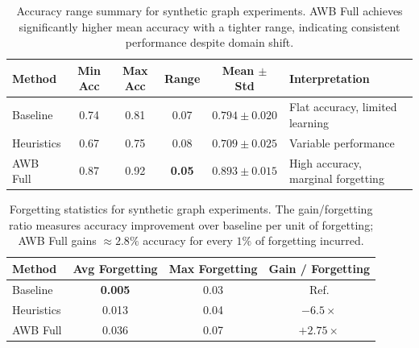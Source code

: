 \begin{table}[!htb]
\centering
\caption{Accuracy range summary for synthetic graph experiments. AWB Full achieves significantly higher mean accuracy with a tighter range, indicating consistent performance despite domain shift.}
\label{tab:accuracy_range}
\begin{tabular}{lccccl}
\toprule
\textbf{Method} & \textbf{Min Acc} & \textbf{Max Acc} & \textbf{Range} & \textbf{Mean $\pm$ Std} & \textbf{Interpretation} \\
\midrule
Baseline   & 0.74 & 0.81 & 0.07 & $0.794 \pm 0.020$ & Flat accuracy, limited learning \\
Heuristics & 0.67 & 0.75 & 0.08 & $0.709 \pm 0.025$ & Variable performance \\
AWB Full   & 0.87 & 0.92 & \textbf{0.05} & $\mathbf{0.893 \pm 0.015}$ & High accuracy, marginal forgetting \\
\bottomrule
\end{tabular}
\end{table}

\begin{table}[!htb]
\centering
\caption{Forgetting statistics for synthetic graph experiments. The gain/forgetting ratio measures accuracy improvement over baseline per unit of forgetting; AWB Full gains ${\approx}2.8\%$ accuracy for every $1\%$ of forgetting incurred.}
\label{tab:forgetting_stats}
\begin{tabular}{lccc}
\toprule
\textbf{Method} & \textbf{Avg Forgetting} & \textbf{Max Forgetting} & \textbf{Gain / Forgetting} \\
\midrule
Baseline   & \textbf{0.005} & 0.03 & Ref. \\
Heuristics & 0.013          & 0.04 & $-6.5\times$ \\
AWB Full   & 0.036          & 0.07 & $\mathbf{+2.75\times}$ \\
\bottomrule
\end{tabular}
\end{table}

